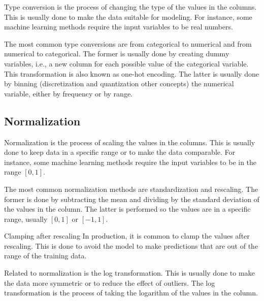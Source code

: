 Type conversion is the process of changing the type of the values in the columns.  This
is usually done to make the data suitable for modeling.  For instance, some machine
learning methods require the input variables to be real numbers.

The most common type conversions are from categorical to numerical and from numerical to
categorical.  The former is usually done by creating dummy variables, i.e., a new column
for each possible value of the categorical variable.  This transformation is also known as
one-hot encoding.  The latter is usually done by binning (discretization and quantization
other concepts) the numerical variable, either by
frequency or by range.


\subsection{Normalization}

Normalization is the process of scaling the values in the columns.  This is usually done to
keep data in a specific range or to make the data comparable.  For instance, some machine
learning methods require the input variables to be in the range $[0, 1]$.

The most common normalization methods are standardization and rescaling.  The former is done
by subtracting the mean and dividing by the standard deviation of the values in the column.
The latter is performed so the values are in a specific range, usually $[0, 1]$ or $[-1, 1]$.

\begin{hlbox}{Clamping after rescaling}
  In production, it is common to clamp the values after rescaling.  This is done to avoid
  the model to make predictions that are out of the range of the training data.
\end{hlbox}

Related to normalization is the log transformation.  This is usually done to make the data
more symmetric or to reduce the effect of outliers.  The log transformation is the process
of taking the logarithm of the values in the column.

